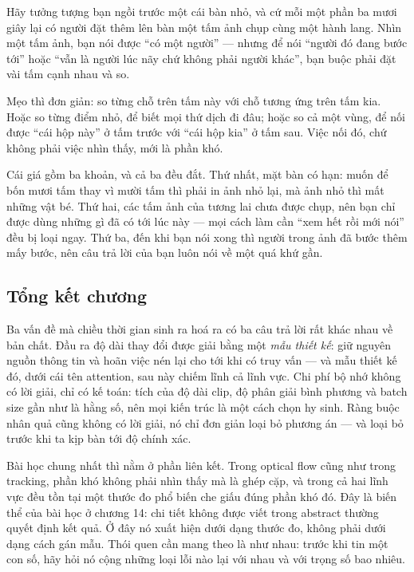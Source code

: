 \documentclass[../../deep_learning.tex]{subfiles}
\begin{document}
\begin{dongian}
Hãy tưởng tượng bạn ngồi trước một cái bàn nhỏ, và cứ mỗi một phần ba mươi giây lại có người đặt thêm lên bàn một tấm ảnh chụp cùng một hành lang. Nhìn một tấm ảnh, bạn nói được ``có một người'' --- nhưng để nói ``người đó đang bước tới'' hoặc ``vẫn là người lúc nãy chứ không phải người khác'', bạn buộc phải đặt vài tấm cạnh nhau và so.

Mẹo thì đơn giản: so từng chỗ trên tấm này với chỗ tương ứng trên tấm kia. Hoặc so từng điểm nhỏ, để biết mọi thứ dịch đi đâu; hoặc so cả một vùng, để nối được ``cái hộp này'' ở tấm trước với ``cái hộp kia'' ở tấm sau. Việc nối đó, chứ không phải việc nhìn thấy, mới là phần khó.

Cái giá gồm ba khoản, và cả ba đều đắt. Thứ nhất, mặt bàn có hạn: muốn để bốn mươi tấm thay vì mười tấm thì phải in ảnh nhỏ lại, mà ảnh nhỏ thì mất những vật bé. Thứ hai, các tấm ảnh của tương lai chưa được chụp, nên bạn chỉ được dùng những gì đã có tới lúc này --- mọi cách làm cần ``xem hết rồi mới nói'' đều bị loại ngay. Thứ ba, đến khi bạn nói xong thì người trong ảnh đã bước thêm mấy bước, nên câu trả lời của bạn luôn nói về một quá khứ gần.

\end{dongian}

\subsection*{Tổng kết chương}
Ba vấn đề mà chiều thời gian sinh ra hoá ra có ba câu trả lời rất khác nhau về bản chất. Đầu ra độ dài thay đổi được giải bằng một \emph{mẫu thiết kế}: giữ nguyên nguồn thông tin và hoãn việc nén lại cho tới khi có truy vấn --- và mẫu thiết kế đó, dưới cái tên attention, sau này chiếm lĩnh cả lĩnh vực. Chi phí bộ nhớ không có lời giải, chỉ có kế toán: tích của độ dài clip, độ phân giải bình phương và batch size gần như là hằng số, nên mọi kiến trúc là một cách chọn hy sinh. Ràng buộc nhân quả cũng không có lời giải, nó chỉ đơn giản loại bỏ phương án --- và loại bỏ trước khi ta kịp bàn tới độ chính xác.

Bài học chung nhất thì nằm ở phần liên kết. Trong optical flow cũng như trong tracking, phần khó không phải nhìn thấy mà là ghép cặp, và trong cả hai lĩnh vực đều tồn tại một thước đo phổ biến che giấu đúng phần khó đó. Đây là biến thể của bài học ở chương 14: chi tiết không được viết trong abstract thường quyết định kết quả. Ở đây nó xuất hiện dưới dạng thước đo, không phải dưới dạng cách gán mẫu. Thói quen cần mang theo là như nhau: trước khi tin một con số, hãy hỏi nó cộng những loại lỗi nào lại với nhau và với trọng số bao nhiêu.
\end{document}
